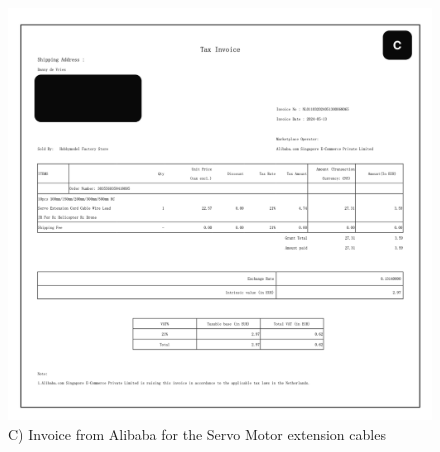 \documentclass[a4paper]{article}
\begin{document}
\begin{figure}[h]
    \centering
    \includegraphics[width=1\textwidth]{extension_cables.jpg}
    \caption{C) Invoice from Alibaba for the Servo Motor extension cables}
    \label{fig:mesh1}
\end{figure}
\end{document}
